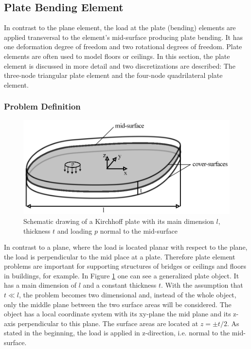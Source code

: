  \subsection{Plate Bending Element}\label{sec:Shell-Plate}
  In contrast to the plane element, the load at the plate (bending) elements are applied transversal to the element's mid-surface producing plate bending. It has one deformation degree of freedom and two rotational degrees of freedom. Plate elements are often used to model floors or ceilings. In this section, the plate element is discussed in more detail and two discretizations are described: The three-node triangular plate element and the four-node quadrilateral plate element.  
  
  \subsubsection{Problem Definition}\label{sec:Shell-Plate-ProbDef}
  \begin{figure}[htbp] %
  	\centering
  	\includegraphics[width=0.9\linewidth]{figures/plate}
  	\caption{Schematic drawing of a Kirchhoff plate with its main dimension $l$, thickness $t$ and loading $p$ normal to the mid-surface}
  	\label{fig:plate}
  \end{figure}
  In contrast to a plane, where the load is located planar with respect to the plane, the load is perpendicular to the mid place at a plate. Therefore plate element problems are important for supporting structures of bridges or ceilings and floors in buildings, for example. In Figure \ref{fig:plate} one can see a generalized plate object. It has a main dimension of $l$ and a constant thickness $t$. With the assumption that $t \ll l$, the problem becomes two dimensional and, instead of the whole object, only the middle plane between the two surface areas will be considered. The object has a local coordinate system with its xy-plane the mid plane and its z-axis perpendicular to this plane. The surface areas are located at $z = \pm t/2$. As stated in the beginning, the load is applied in z-direction, i.e. normal to the mid-surface.
  
